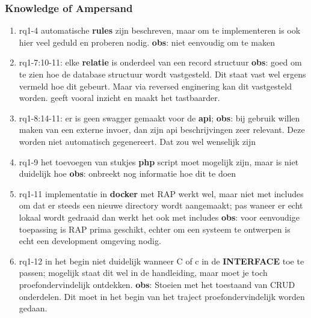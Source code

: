 \subsubsection{Knowledge of Ampersand}
\begin{comment}
- wat zijn de exacte waarnemingen geweest!
plaats hier de afgehandelde items.
\end{comment}
\begin{enumerate}
    \item rq1-4 automatische \textbf{rules} zijn beschreven, maar om te implementeren is ook hier veel geduld en proberen nodig. 
    \newline\textbf{obs}: niet eenvoudig om te maken
    
    \item rq1-7:10-11: elke \textbf{relatie} is onderdeel van een record structuur
    \newline\textbf{obs}: goed om te zien hoe de database structuur wordt vastgesteld. 
    Dit staat vast wel ergens vermeld hoe dit gebeurt.
    Maar via reversed enginering kan dit vastgesteld worden.
    geeft vooral inzicht en maakt het tastbaarder.
    
    \item rq1-8:14-11: er is geen swagger gemaakt voor de \textbf{api}; 
    \newline\textbf{obs}: bij gebruik willen maken van een externe invoer, dan zijn api beschrijvingen zeer relevant. 
    Deze worden niet automatisch gegenereert. 
    Dat zou wel wenselijk zijn
    
    \item rq1-9 het toevoegen van stukjes \textbf{php} script moet mogelijk zijn, maar is niet duidelijk hoe
    \newline\textbf{obs}: onbreekt nog informatie hoe dit te doen
    
    \item rq1-11 implementatie in \textbf{docker} met RAP werkt wel, maar niet met includes om dat er steeds een nieuwe directory wordt aangemaakt; pas waneer er echt lokaal wordt gedraaid dan werkt het ook met includes
    \newline\textbf{obs}: voor eenvoudige toepassing is RAP prima geschikt, echter om een systeem te ontwerpen is echt een development omgeving nodig.
    
    \item rq1-12 in het begin niet duidelijk wanneer C of c in de \textbf{INTERFACE} toe te passen; mogelijk staat dit wel in de handleiding, maar moet je toch proefondervindelijk ontdekken.
    \newline\textbf{obs}: Stoeien met het toestaand van CRUD onderdelen. 
    Dit moet in het begin van het traject proefondervindelijk worden gedaan.
    

\end{enumerate}
